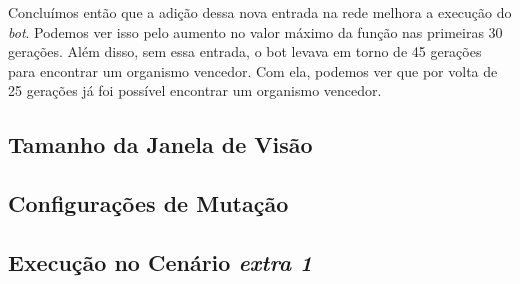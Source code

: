 Concluímos então que a adição dessa nova entrada na rede melhora a execução do
\textit{bot}. Podemos ver isso pelo aumento no valor máximo da função nas
primeiras 30 gerações. Além disso, sem essa entrada, o bot levava em torno de
45 gerações para encontrar um organismo vencedor. Com ela, podemos ver que por
volta de 25 gerações já foi possível encontrar um organismo vencedor.

\subsection{\label{section:experiment-vision}Tamanho da Janela de Visão}


\subsection{Configurações de Mutação}


\subsection{Execução no Cenário \textit{extra 1}}


